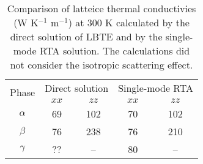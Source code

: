 \documentclass[twocolumn,amsmath,amssymb,a4paper,prb,superscriptaddress,floatfix]{revtex4-1}
\begin{document}
\begin{table}[ht]
	\caption{\label{table:direct} Comparison of latteice thermal conductivies (W K$^{-1}$ m$^{-1}$) at 300 K
			calculated by the direct solution of LBTE and by the  single-mode
		RTA solution. The calculations did not consider the isotropic scattering effect.}
 \begin{ruledtabular}
  \begin{tabular}{ccccc}
   \multirow{2}{*}{Phase}
   & \multicolumn{2}{c}{Direct solution} &
   \multicolumn{2}{c}{Single-mode RTA} \\
   \cline{2-5}
   & $xx$  & $zz$ & $xx$ & $zz$ \\
   \hline
   \multirow{1}{*}{$\alpha$}
   & 69 & 102 & 70 &  102 \\
   \multirow{1}{*}{$\beta$}
   & 76 & 238 & 76 &  210 \\
   \multirow{1}{*}{$\gamma$}
   & ?? & -- & 80 &   -- \\
  \end{tabular}
 \end{ruledtabular}
\end{table}
\end{document}
